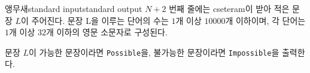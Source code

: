 \begin{problem}{앵무새}{standard input}{standard output}
$N+2$ 번째 줄에는 cseteram이 받아 적은 문장 $L$이 주어진다. 문장 L을 이루는 단어의 수는 $1$개 이상 $10000$개 이하이며, 각 단어는 $1$개 이상 $32$개 이하의 영문 소문자로 구성된다.

\OutputFile
문장 $L$이 가능한 문장이라면 \texttt{Possible}을, 불가능한 문장이라면 \texttt{Impossible}을 출력한다.

\Example

\begin{example}
%
%
%
\end{example}

\end{problem}
